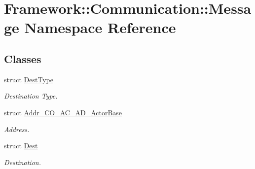 \hypertarget{namespaceFramework_1_1Communication_1_1Message}{
\section{Framework::Communication::Message Namespace Reference}
\label{namespaceFramework_1_1Communication_1_1Message}
}
\subsection*{Classes}
\begin{DoxyCompactItemize}
\item 
struct \hyperlink{structFramework_1_1Communication_1_1Message_1_1DestType}{DestType}
\begin{DoxyCompactList}\small\item\em Destination Type. \item\end{DoxyCompactList}\item 
struct \hyperlink{structFramework_1_1Communication_1_1Message_1_1Addr__CO__AC__AD__ActorBase}{Addr\_\-CO\_\-AC\_\-AD\_\-ActorBase}
\begin{DoxyCompactList}\small\item\em Address. \item\end{DoxyCompactList}\item 
struct \hyperlink{structFramework_1_1Communication_1_1Message_1_1Dest}{Dest}
\begin{DoxyCompactList}\small\item\em Destination. \item\end{DoxyCompactList}\end{DoxyCompactItemize}
